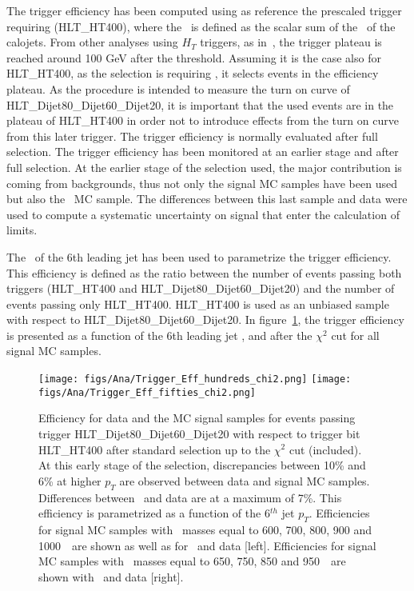 The trigger efficiency has been computed using as reference the prescaled trigger requiring  (HLT\_HT400), where the \HT~is defined as the scalar sum of the \pt~of the calojets. From other analyses using $H_{T}$ triggers, as in~\cite{Khachatryan:2015axa}, the trigger plateau is reached around 100 GeV after the threshold. Assuming it is the case also for HLT\_HT400, as the selection is requiring , it selects events in the efficiency plateau. As the procedure is intended to measure the turn on curve of HLT\_Dijet80\_Dijet60\_Dijet20, it is important that the used events are in the plateau of HLT\_HT400 in order not to introduce effects from the turn on curve from this later trigger. The trigger efficiency is normally evaluated after full selection. The trigger efficiency has been monitored at an earlier stage and after full selection. At the earlier stage of the selection used, the major contribution is coming from backgrounds, thus not only the signal MC samples have been used but also the \ttbar~MC sample. The differences between this last sample and data were used to compute a systematic uncertainty on signal that enter the calculation of limits.

The \pt~of the 6th leading jet has been used to parametrize the trigger efficiency. This efficiency is defined as the ratio between the number of events passing both triggers (HLT\_HT400 and HLT\_Dijet80\_Dijet60\_Dijet20) and the number of events passing only HLT\_HT400. HLT\_HT400 is used as an unbiased sample with respect to HLT\_Dijet80\_Dijet60\_Dijet20. In figure~\ref{fig:TrigEff}, the trigger efficiency is presented as a function of the 6th leading jet \pt, and after the $\chi^{2}$ cut for all signal MC samples. 

\begin{figure}[!Hhtbp]
  \begin{center}
    \texttt{[image: figs/Ana/Trigger\_Eff\_hundreds\_chi2.png]}
    \texttt{[image: figs/Ana/Trigger\_Eff\_fifties\_chi2.png]}
    \caption{Efficiency for data and the MC signal samples for events passing trigger HLT\_Dijet80\_Dijet60\_Dijet20 with respect to trigger bit HLT\_HT400 after standard selection up to the $\chi^{2}$ cut (included). At this early stage of the selection, discrepancies between 10\% and 6\% at higher $p_{T}$ are observed between data and signal MC samples. Differences between \ttbar~and data are at a maximum of 7\%. This efficiency is parametrized as a function of the 6$^{th}$ jet $p_{T}$. Efficiencies for signal MC samples with \Tp~masses equal to 600, 700, 800, 900 and 1000~\GeVcc~are shown as well as for \ttbar~and data [left]. Efficiencies for signal MC samples with \Tp~masses equal to 650, 750, 850 and 950~\GeVcc~are shown with \ttbar~and data [right].}
    \label{fig:TrigEff}
  \end{center}
\end{figure}


